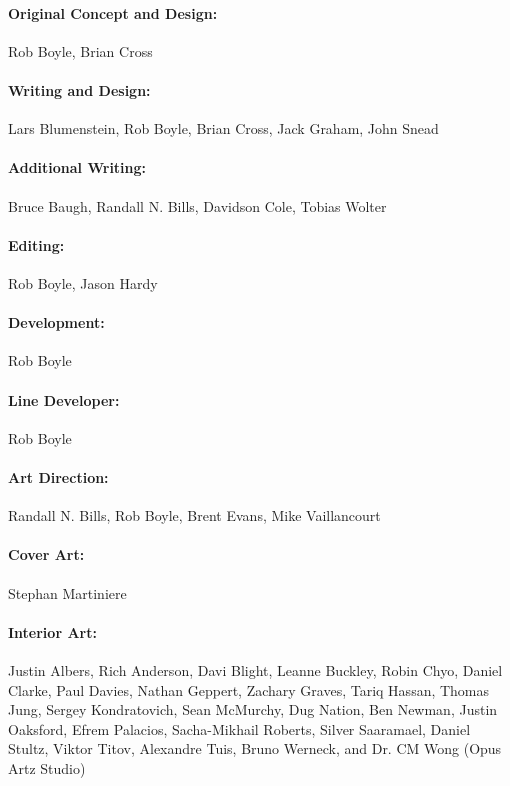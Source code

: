 \paragraph{Original Concept and Design:}
\label{sec:orig-conc-design}
Rob Boyle, Brian Cross

\paragraph{Writing and Design:}
\label{sec:writing-design}
Lars Blumenstein, Rob Boyle, Brian Cross, Jack Graham, John Snead

\paragraph{Additional Writing:}
\label{sec:additional-writing}
Bruce Baugh, Randall N. Bills, Davidson Cole, Tobias Wolter

\paragraph{Editing:}
\label{sec:editing}
Rob Boyle, Jason Hardy

\paragraph{Development:}
\label{sec:development}
Rob Boyle

\paragraph{Line Developer:}
\label{sec:line-developer}
Rob Boyle

\paragraph{Art Direction:}
\label{sec:art-direction}
Randall N. Bills, Rob Boyle, Brent Evans, Mike Vaillancourt

\paragraph{Cover Art:}
\label{sec:cover-art}
Stephan Martiniere

\paragraph{Interior Art:}
\label{sec:interior-art}
Justin Albers, Rich Anderson, Davi Blight, Leanne Buckley, Robin
Chyo, Daniel Clarke, Paul Davies, Nathan Geppert, Zachary Graves,
Tariq Hassan, Thomas Jung, Sergey Kondratovich, Sean McMurchy, Dug
Nation, Ben Newman, Justin Oaksford, Efrem Palacios, Sacha-Mikhail
Roberts, Silver Saaramael, Daniel Stultz, Viktor Titov, Alexandre
Tuis, Bruno Werneck, and Dr. CM Wong (Opus Artz Studio)

